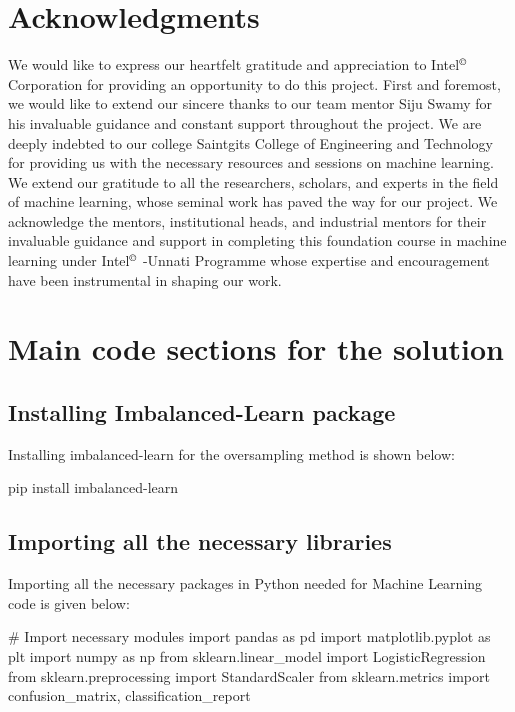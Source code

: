 \documentclass{josis}
\begin{document}
{\section{Acknowledgments}
We would like to express our heartfelt gratitude and appreciation to Intel$^\copyright$ Corporation for providing an opportunity to do this project. First and foremost, we would like to extend our sincere thanks to our team mentor Siju Swamy for his invaluable guidance and constant support throughout the project. We are deeply indebted to our college Saintgits College of Engineering and Technology for providing us with the necessary resources and sessions on machine learning. We extend our gratitude to all the researchers, scholars, and experts in the field of machine learning, whose seminal work has paved the way for our project. We acknowledge the mentors, institutional heads, and industrial mentors for their invaluable guidance and support in completing this foundation course in machine learning under Intel$^\copyright$ -Unnati Programme whose expertise and encouragement have been instrumental in shaping our work.
\cite{*}


\appendix

\section{Main code sections for the solution}

\subsection{Installing Imbalanced-Learn package}
 Installing imbalanced-learn for the oversampling method is shown below:
\begin{python}
pip install imbalanced-learn
\end{python}

\subsection{Importing all the  necessary libraries}
Importing all the necessary packages in Python needed for Machine Learning code is
given below:
\begin{python}
# Import necessary modules 
import pandas as pd 
import matplotlib.pyplot as plt 
import numpy as np 
from sklearn.linear_model import LogisticRegression 
from sklearn.preprocessing import StandardScaler 
from sklearn.metrics import confusion_matrix, classification_report 
\end{python}

}
\end{document}
